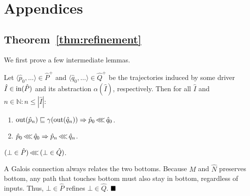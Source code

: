 \section{Appendices}

\subsection{Theorem~\ref{thm:refinement}}

We first prove a few intermediate lemmas.

\begin{lemma}
Let $\langle \hat p_{0}, \ldots \rangle \in \hat P^{+}$ and $\langle \hat q_{0}, \ldots \rangle \in \hat Q^{+}$ be the trajectories induced by some driver $\hat I \in \operatorname{in}(\hat P)$ and its abstraction $\alpha(\hat I)$, respectively. Then for all $\hat I$ and $n \in \mathbb{N} : n \leq | \hat I |$:
\begin{enumerate}
  \item $\operatorname{out}(\hat p_{n}) \sqsubseteq \gamma(\operatorname{out}(\hat q_{n})) \Rightarrow \hat p_{0} \operatorname{\lll} \hat q_{0}$.
  \item $\hat p_{0} \operatorname{\lll} \hat q_{0} \Rightarrow \hat p_{n} \operatorname{\lll} \hat q_{n}$.
\end{enumerate}
\end{lemma}






\begin{lemma} \label{lem:bot-refine-bot}
$(\bot \in \hat P) \operatorname{\lll} \, (\bot \in \hat Q)$.
\end{lemma}

A Galois connection always relates the two bottoms. Because $\hat M$ and $\hat N$ preserves bottom, any path that touches bottom must also stay in bottom, regardless of inputs. Thus, $\bot \in \hat P$ refines $\bot \in \hat Q$. $\qedb$

